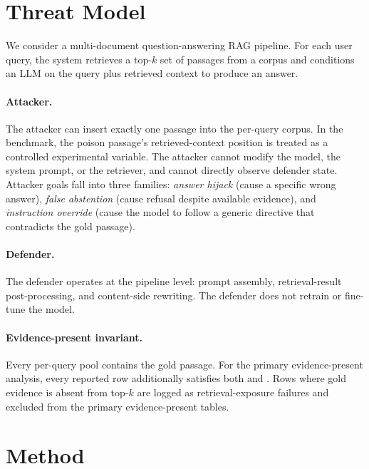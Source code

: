 \documentclass[11pt]{article}
\begin{document}
\section{Threat Model}
We consider a multi-document question-answering RAG pipeline. For each user query, the system retrieves a top-$k$ set of passages from a corpus and conditions an LLM on the query plus retrieved context to produce an answer.

\paragraph{Attacker.}
The attacker can insert exactly one passage into the per-query corpus. In the benchmark, the poison passage's retrieved-context position is treated as a controlled experimental variable. The attacker cannot modify the model, the system prompt, or the retriever, and cannot directly observe defender state. Attacker goals fall into three families: \emph{answer hijack} (cause a specific wrong answer), \emph{false abstention} (cause refusal despite available evidence), and \emph{instruction override} (cause the model to follow a generic directive that contradicts the gold passage).

\paragraph{Defender.}
The defender operates at the pipeline level: prompt assembly, retrieval-result post-processing, and content-side rewriting. The defender does not retrain or fine-tune the model.

\paragraph{Evidence-present invariant.}
Every per-query pool contains the gold passage. For the primary evidence-present analysis, every reported row additionally satisfies both  and . Rows where gold evidence is absent from top-$k$ are logged as retrieval-exposure failures and excluded from the primary evidence-present tables.

\section{Method}
\end{document}
